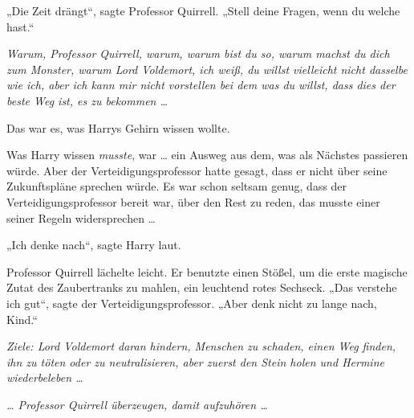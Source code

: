„Die Zeit drängt“, sagte Professor Quirrell.
„Stell deine Fragen, wenn du welche hast.“

\emph{Warum, Professor Quirrell, warum, warum bist du so, warum machst du dich zum Monster, warum Lord Voldemort, ich weiß, du willst vielleicht nicht dasselbe wie ich, aber ich kann mir nicht vorstellen bei dem was du willst, dass \emph{dies} der beste Weg ist, es zu bekommen …}

Das war es, was Harrys Gehirn wissen wollte.

Was Harry wissen \emph{musste}, war … ein Ausweg aus dem, was als Nächstes passieren würde. Aber der Verteidigungsprofessor hatte gesagt, dass er nicht über seine Zukunftspläne sprechen würde. Es war schon seltsam genug, dass der Verteidigungsprofessor bereit war, über den Rest zu reden, das musste einer seiner Regeln widersprechen …

„Ich denke nach“, sagte Harry laut.

Professor Quirrell lächelte leicht. Er benutzte einen Stößel, um die erste magische Zutat des Zaubertranks zu mahlen, ein leuchtend rotes Sechseck.
„Das verstehe ich gut“, sagte der Verteidigungsprofessor.
„Aber denk nicht zu lange nach, Kind.“

\emph{Ziele: Lord Voldemort daran hindern, Menschen zu schaden, einen Weg finden, ihn zu töten oder zu neutralisieren, aber zuerst den Stein holen und Hermine wiederbeleben …}

\emph{… Professor Quirrell überzeugen, damit aufzuhören …}

